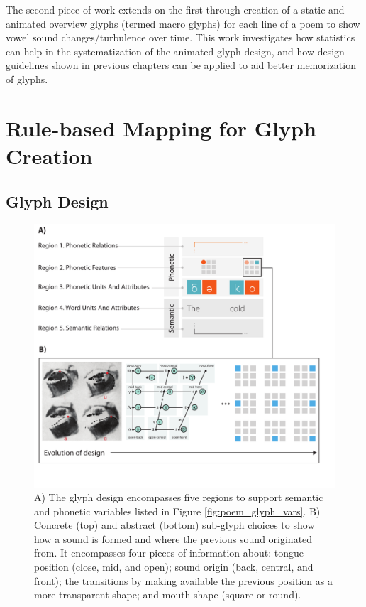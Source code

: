 The second piece of work extends on the first through creation of a static and animated overview glyphs (termed macro glyphs) for each line of a poem to show vowel sound changes/turbulence over time.
This work investigates how statistics can help in the systematization of the animated glyph design, and how design guidelines shown in previous chapters can be applied to aid better memorization of glyphs.


\section{Rule-based Mapping for Glyph Creation}

\subsection{Glyph Design}

\begin{figure}[h!]
\centering
\includegraphics[width=\textwidth]{images/other_glyphs/poem_glyph_design}
\caption{A) The glyph design encompasses five regions to support semantic and phonetic variables listed in Figure \ref{fig:poem_glyph_vars}. 
B) Concrete (top) and abstract (bottom) sub-glyph choices to show how a sound is formed and where the previous sound originated from. It encompasses four pieces of information about: tongue position (close, mid, and open); sound origin (back, central, and front); the transitions by making available the previous position as a more transparent shape; and mouth shape (square or round).}
\label{fig:poem_glyph_design}
\end{figure}

